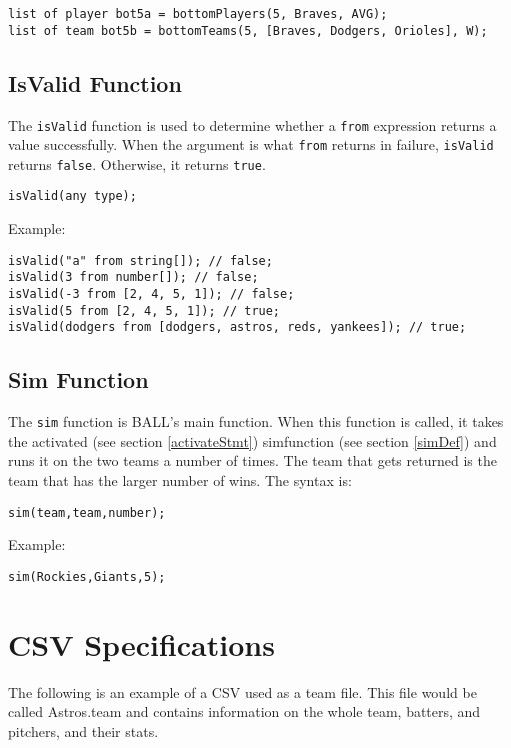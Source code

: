 \begin{verbatim}
list of player bot5a = bottomPlayers(5, Braves, AVG);
list of team bot5b = bottomTeams(5, [Braves, Dodgers, Orioles], W);
\end{verbatim}

\subsection{IsValid Function}
The \texttt{isValid} function is used to determine whether a
\texttt{from} expression returns a value successfully. When the
argument is what \texttt{from} returns in failure, \texttt{isValid}
returns \texttt{false}. Otherwise, it returns \texttt{true}.

\begin{verbatim}
isValid(any type);
\end{verbatim}
Example: 
\begin{verbatim}
isValid("a" from string[]); // false;
isValid(3 from number[]); // false;
isValid(-3 from [2, 4, 5, 1]); // false;
isValid(5 from [2, 4, 5, 1]); // true;
isValid(dodgers from [dodgers, astros, reds, yankees]); // true;
\end{verbatim}

\subsection{Sim Function}
The \texttt{sim} function is BALL's main function. When this function
is called, it takes the activated (see section \ref{activateStmt})
simfunction (see section \ref{simDef}) and runs it on the two teams a
number of times. The team that gets returned is the team that has the
larger number of wins. The syntax is:
\begin{verbatim}
sim(team,team,number);
\end{verbatim}
Example: 
\begin{verbatim}
sim(Rockies,Giants,5); 
\end{verbatim}

\section{CSV Specifications}\label{csv} 
The following is an example of a CSV used as a team file. This file
would be called Astros.team and contains information on the whole
team, batters, and pitchers, and their stats.

